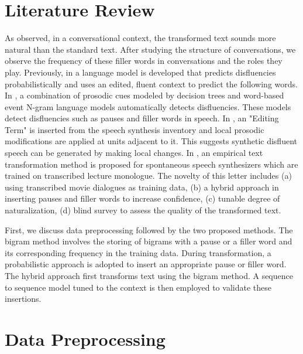 \documentclass[journal]{IEEEtran}
\begin{document}
\section{Literature Review}

As observed, in a conversational context, the transformed text sounds more natural than the standard text. After studying the structure of conversations, we observe the frequency of these filler words in conversations\cite{freq} and the roles they play\cite{disc}. Previously, in \cite{stolcke1} a language model is developed that predicts disfluencies probabilistically and uses an edited, fluent context to predict the following words. In \cite{stolcke2}, a combination of prosodic cues modeled by decision trees and word-based event N-gram language models automatically detects disfluencies. These models detect disfluencies such as pauses and filler words in speech. In \cite{local}, an "Editing Term" is inserted from the speech synthesis inventory and local prosodic modifications are applied at units adjacent to it. This suggests synthetic disfluent speech can be generated by making local changes. In \cite{sundaram}, an empirical text transformation method is proposed for spontaneous speech synthesizers which are trained on transcribed lecture monologue. The novelty of this letter includes (a) using transcribed movie dialogues as training data, (b) a hybrid approach in inserting pauses and filler words to increase confidence, (c) tunable degree of naturalization, (d) blind survey to assess the quality of the transformed text.

First, we discuss data preprocessing followed by the two proposed methods. The bigram method involves the storing of bigrams with a pause or a filler word and its corresponding frequency in the training data. During transformation, a probabilistic approach is adopted to insert an appropriate pause or filler word. The hybrid approach first transforms text using the bigram method. A sequence to sequence model tuned to the context is then employed to validate these insertions.

\section{Data Preprocessing}
\end{document}
